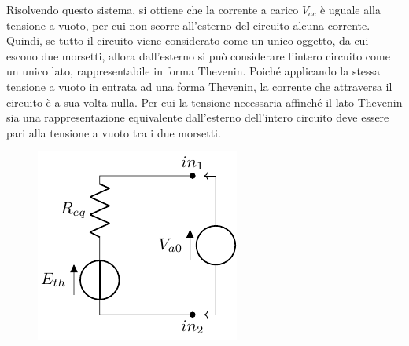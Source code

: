 \documentclass{article}
\numberwithin{equation}{subsection}
\begin{document}
Risolvendo questo sistema, si ottiene che la corrente a carico $V_{ac}$ è uguale alla tensione a vuoto, per cui non scorre all'esterno del circuito alcuna corrente. Quindi, 
se tutto il circuito viene 
considerato come un unico oggetto, da cui escono due morsetti, allora dall'esterno si può considerare l'intero circuito come un unico lato, rappresentabile in forma 
Thevenin. Poiché applicando la stessa tensione a vuoto in entrata ad una forma Thevenin, la corrente che attraversa il circuito è a sua volta nulla. Per cui la tensione 
necessaria affinché il lato Thevenin sia una rappresentazione equivalente dall'esterno dell'intero circuito deve essere pari alla tensione a vuoto tra i due morsetti. 
\begin{figure}[H]%
    \centering
    \includegraphics{rappresentazione-thevenin-circuito-8.pdf}
    \label{fig:rappresentazione-thevenin-circuito-8}
\end{figure}
\end{document}
